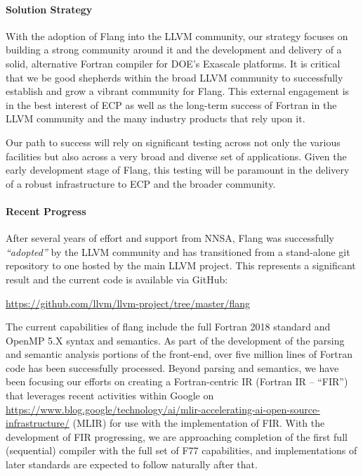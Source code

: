 \paragraph{Solution Strategy}

With the adoption of Flang into the LLVM community, our strategy
focuses on building a strong community around it and the development
and delivery of a solid, alternative Fortran compiler for DOE's
Exascale platforms.  It is critical that we be good shepherds within
the broad LLVM community to successfully establish and grow a vibrant
community for Flang. This external engagement is in the best interest
of ECP as well as the long-term success of Fortran in the LLVM
community and the many industry products that rely upon it.

Our path to success will rely on significant testing across not only
the various facilities but also across a very broad and diverse set of
applications. Given the early development stage of Flang, this testing
will be paramount in the delivery of a robust infrastructure to ECP
and the broader community.

\paragraph{Recent Progress}

After several years of effort and support from NNSA, Flang was 
successfully \emph{``adopted''} by the LLVM community and has transitioned 
from a stand-alone git repository to one hosted by the main LLVM project.  This 
represents a significant result and the current code is available via GitHub:

\begin{center}
\url{https://github.com/llvm/llvm-project/tree/master/flang}
\end{center}

The current capabilities of flang include the full Fortran 2018
standard and OpenMP 5.X syntax and semantics.  As part of the
development of the parsing and semantic analysis portions of the
front-end, over five million lines of Fortran code has been
successfully processed. Beyond parsing and semantics, we have been
focusing our efforts on creating a Fortran-centric IR 
(Fortran IR -- ``FIR'') that leverages recent activities 
within Google on 
\href{Multi-Level Intermediate Representations} 
{https://www.blog.google/technology/ai/mlir-accelerating-ai-open-source-infrastructure/}
(MLIR) for use with the implementation of FIR.
With the development of FIR progressing, we are approaching completion of 
the first full (sequential) compiler with the full set of F77 
capabilities, and implementations of later standards are expected to 
follow naturally after that.

